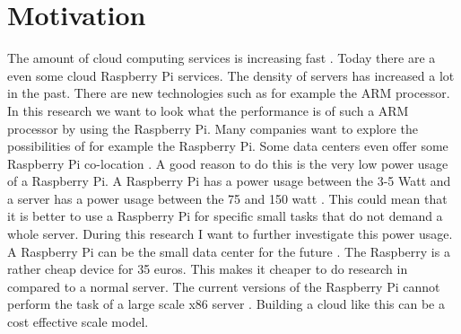 \documentclass{sig-alternate-br}
\begin{document}


\section{Motivation}
The amount of cloud computing services is increasing fast \cite{armbrust:2009}. 
Today there are a even some cloud Raspberry Pi services. The density of servers has increased a lot in the past\cite{density}. There are new technologies such as for example the ARM processor. In this research we want to look what the performance is of such  a ARM processor by using the Raspberry Pi. Many companies want to explore the possibilities of for example the Raspberry Pi. Some data centers even offer some Raspberry Pi co-location \cite{hosting,Pcextreme}. A good reason to do this is the very low power usage of a Raspberry Pi. A Raspberry Pi has a power usage between the 3-5 Watt and a server has a power usage between the 75 and 150 watt \cite{Powerusage}. This could mean that it is better to use a Raspberry Pi for specific small tasks that do not demand a whole server. During this research I want to further investigate this power usage.  A Raspberry Pi can be the small data center for the future \cite{tso:2013}. The Raspberry is a rather cheap device for 35 euros. This makes it cheaper to do research in compared to a normal server. The current versions of the Raspberry Pi cannot perform the task of a large scale x86 server \cite{tso:2013}. Building a cloud like this can be a cost effective scale model\cite{tso:2013}. 





\end{document}
